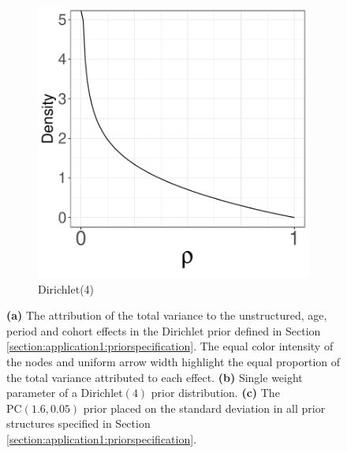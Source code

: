 \begin{figure}[h!]
\begin{subfigure}[b]{0.35\textwidth}
        \includegraphics[width=\textwidth]{Figures/prior_dir4.pdf}
        \caption[]%
        {{\small Dirichlet(4)}}    
        \label{figure:application1:dir4}
    \end{subfigure}
    \caption{\textbf{(a)} The attribution of the total variance to the unstructured, age, period and cohort effects in the Dirichlet prior defined in Section \ref{section:application1:priorspecification}. The equal color intensity of the nodes and uniform arrow width highlight the equal proportion of the total variance attributed to each effect. \textbf{(b)} Single weight parameter of a Dirichlet$(4)$ prior distribution. \textbf{(c)} The $\text{PC}(1.6,0.05)$ prior placed on the standard deviation in all prior structures specified in Section \ref{section:application1:priorspecification}. }
    \label{fig:application1:priors}
\end{figure}

